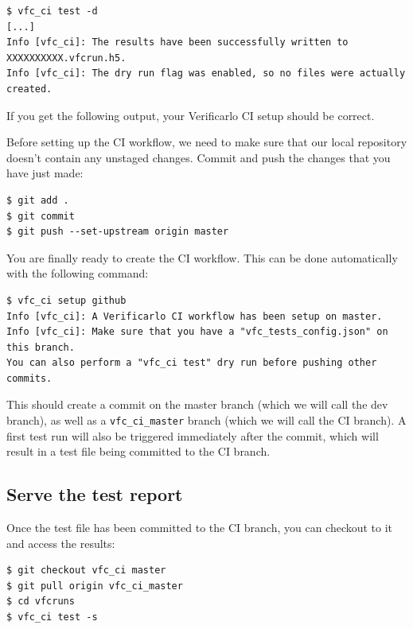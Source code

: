 \bigbreak

\begin{verbatim}
$ vfc_ci test -d
[...]
Info [vfc_ci]: The results have been successfully written to XXXXXXXXXX.vfcrun.h5.
Info [vfc_ci]: The dry run flag was enabled, so no files were actually created.
\end{verbatim}

If you get the following output, your Verificarlo CI setup should be correct.

\bigbreak

Before setting up the CI workflow, we need to make sure that our local repository doesn't contain any unstaged changes. Commit and push the changes that you have just made:

\bigbreak

\begin{verbatim}
$ git add .
$ git commit
$ git push --set-upstream origin master
\end{verbatim}

You are finally ready to create the CI workflow. This can be done automatically with the following command:

\bigbreak

\begin{verbatim}
$ vfc_ci setup github
Info [vfc_ci]: A Verificarlo CI workflow has been setup on master.
Info [vfc_ci]: Make sure that you have a "vfc_tests_config.json" on this branch.
You can also perform a "vfc_ci test" dry run before pushing other commits.
\end{verbatim}

This should create a commit on the master branch (which we will call the dev
branch), as well as a \texttt{vfc_ci_master} branch (which we will call the
CI branch). A first test run will also be triggered immediately after the
commit, which will result in a test file being committed to the CI branch.


\subsection{Serve the test report}

Once the test file has been committed to the CI branch, you can checkout to it and access the results:

\bigbreak

\begin{verbatim}
$ git checkout vfc_ci master
$ git pull origin vfc_ci_master
$ cd vfcruns
$ vfc_ci test -s
\end{verbatim}

